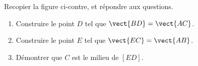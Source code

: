 
\begin{exercice}\label{exosmath-0070}

    \begin{multicols}{2}

        Recopier la figure ci-contre, et répondre aux questions.
        \begin{enumerate}
            \item
                Construire le point \( D\) tel que \( \vect{ BD }=\vect{ AC }\).
            \item
                Construire le point \( E\) tel que \( \vect{ EC }=\vect{ AB }\).
            \item
                Démontrer que \( C\) est le milieu de \( [ED]\).
        \end{enumerate}

        \columnbreak



    \end{multicols}

\end{exercice}
